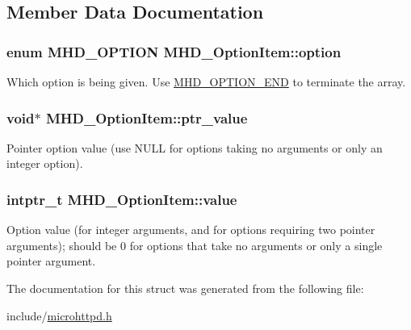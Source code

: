 \subsection{\-Member \-Data \-Documentation}
\hypertarget{structMHD__OptionItem_a69a1d5ea39bc8c7c2c31605825af1678}{
\subsubsection[{option}]{\setlength{\rightskip}{0pt plus 5cm}enum {\bf \-M\-H\-D\-\_\-\-O\-P\-T\-I\-O\-N} {\bf \-M\-H\-D\-\_\-\-Option\-Item\-::option}}}\label{structMHD__OptionItem_a69a1d5ea39bc8c7c2c31605825af1678}
\-Which option is being given. \-Use \hyperlink{microhttpd_8h_a159aba015765dbe1096c8726a18ff250af1faf6e266f8fe51c87919635febb96d}{\-M\-H\-D\-\_\-\-O\-P\-T\-I\-O\-N\-\_\-\-E\-N\-D} to terminate the array. \hypertarget{structMHD__OptionItem_aed7ca1850f1fdc0a8b45573fbb4f7e24}{
\subsubsection[{ptr\-\_\-value}]{\setlength{\rightskip}{0pt plus 5cm}void$\ast$ {\bf \-M\-H\-D\-\_\-\-Option\-Item\-::ptr\-\_\-value}}}\label{structMHD__OptionItem_aed7ca1850f1fdc0a8b45573fbb4f7e24}
\-Pointer option value (use \-N\-U\-L\-L for options taking no arguments or only an integer option). \hypertarget{structMHD__OptionItem_a5bd8b630776416a694acca0f401a1c2f}{
\subsubsection[{value}]{\setlength{\rightskip}{0pt plus 5cm}intptr\-\_\-t {\bf \-M\-H\-D\-\_\-\-Option\-Item\-::value}}}\label{structMHD__OptionItem_a5bd8b630776416a694acca0f401a1c2f}
\-Option value (for integer arguments, and for options requiring two pointer arguments); should be 0 for options that take no arguments or only a single pointer argument. 

\-The documentation for this struct was generated from the following file\-:\begin{DoxyCompactItemize}
\item 
include/\hyperlink{microhttpd_8h}{microhttpd.\-h}\end{DoxyCompactItemize}

